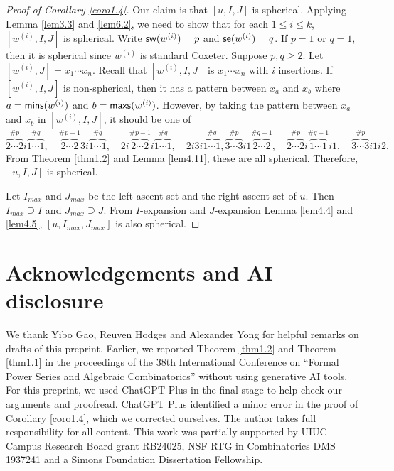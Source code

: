 \documentclass[12pt]{amsart}
\theoremstyle{definition}
\theoremstyle{remark}
\begin{document}
\begin{proof}[Proof of Corollary \ref{coro1.4}]
Our claim is that $[u,I,J]$ is spherical. Applying Lemma \ref{lem3.3} and \ref{lem6.2}, we need to show that for each $1 \leq i \leq k$, $[w^{(i)}, I, J]$ is spherical. Write ${\sf sw}(w^{(i)}) = p$ and ${\sf se}(w^{(i)}) = q$. If $p = 1$ or $q = 1$, then it is spherical since $w^{(i)}$ is standard Coxeter. Suppose $p, q \geq 2$. Let $[w^{(i)} , J] = x_1 \cdots x_n$. Recall that $[w^{(i)}, I , J]$ is $x_1 \cdots x_n$ with $i$ insertions. If $[w^{(i)}, I , J]$ is non-spherical, then it has a pattern between $x_a$ and $x_b$ where $a = {\sf mins}(w^{(i)})$ and $b = {\sf maxs}(w^{(i)})$. However, by taking the pattern between $x_a$ and $x_b$ in $[w^{(i)}, I , J]$, it should be one of
\begin{subequations}
\begin{equation}
\overbrace{2\cdots 2}^{\# p}i\overbrace{1 \cdots 1}^{\# q}, \quad \overbrace{2\cdots 2}^{\# p-1}3i\overbrace{1 \cdots 1}^{\# q}, \quad 2i\overbrace{2\cdots 2}^{\# p-1}i\overbrace{1 \cdots 1}^{\# q} ,\quad 2i3i \overbrace{1 \cdots 1}^{\# q},
\end{equation}
\begin{equation}
\overbrace{3\cdots 3}^{\# p}i1\overbrace{2 \cdots 2}^{\# q-1}, \quad \overbrace{2\cdots 2}^{\# p}i\overbrace{1 \cdots 1}^{\# q-1}i1, \quad \overbrace{3\cdots 3}^{\# p}i1i2.
\end{equation}
\end{subequations}
From Theorem \ref{thm1.2} and Lemma \ref{lem4.11}, these are all spherical. Therefore, $[u,I,J]$ is spherical.

Let $I_{max}$ and $J_{max}$ be the left ascent set and the right ascent set of $u$. Then $I_{max} \supseteq I$ and $J_{max} \supseteq J$. From $I$-expansion and $J$-expansion Lemma \ref{lem4.4} and \ref{lem4.5}, $[u,I_{max}, J_{max}]$ is also spherical.
\end{proof}



\section*{Acknowledgements and AI disclosure}

We thank Yibo Gao, Reuven Hodges and Alexander Yong for helpful remarks on drafts of this preprint. Earlier, we reported Theorem \ref{thm1.2} and Theorem \ref{thm1.1} in the proceedings of the 38th International Conference on ``Formal Power Series and Algebraic Combinatorics'' without using generative AI tools. For this preprint, we used ChatGPT Plus in the final stage to help check our arguments and proofread. ChatGPT Plus identified a minor error in the proof of Corollary \ref{coro1.4}, which we corrected ourselves. The author takes full responsibility for all content. This work was partially supported by UIUC Campus Research Board grant RB24025, NSF RTG in Combinatorics DMS 1937241 and a Simons Foundation Dissertation Fellowship.
\end{document}

